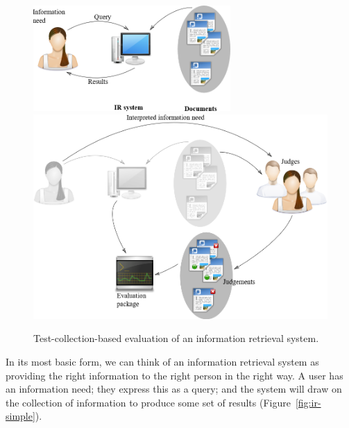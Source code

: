 \begin{figure}
	{
	\includegraphics[width=0.67\textwidth]{images/ir-model}
	\label{fig:ir-simple}
	}\vspace*{3em}
	{
	\includegraphics[width=\textwidth]{images/ir-model-with-judges}
	\label{fig:ir-with-judges}
	}\vspace*{3em}
	\caption{Test-collection-based evaluation of an information retrieval system.}
\end{figure}
In its most basic form, we can think of an information retrieval system as providing the right information to the right person in the right way. A user has an information need; they express this as a query; and the system will draw on the collection of information to produce some set of results (Figure~\ref{fig:ir-simple}).

